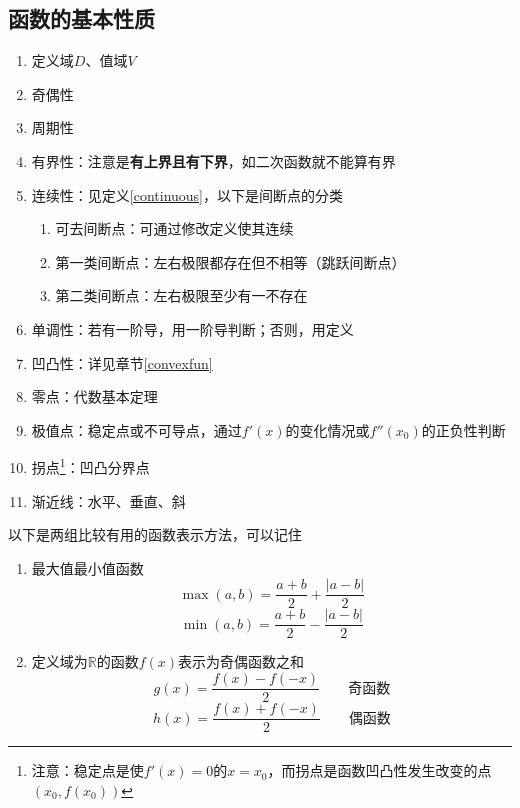 \subsection{函数的基本性质}
\begin{enumerate}
	\itemsep -3pt
	\item 定义域$D$、值域$V$
	\item 奇偶性
	\item 周期性
	\item 有界性：注意是\textbf{有上界且有下界}，如二次函数就不能算有界
	\item 连续性：见定义\ref{continuous}，以下是间断点的分类
	\begin{enumerate}
		\itemsep -3pt
		\item 可去间断点：可通过修改定义使其连续
		\item 第一类间断点：左右极限都存在但不相等（跳跃间断点）
		\item 第二类间断点：左右极限至少有一不存在
	\end{enumerate}
	\item 单调性：若有一阶导，用一阶导判断；否则，用定义
	\item 凹凸性：详见章节\ref{convexfun}
	\item 零点：代数基本定理
	\item 极值点：稳定点或不可导点，通过$f'(x)$的变化情况或$f''(x_0)$的正负性判断
	\item 拐点\footnote{注意：稳定点是使$f'(x)=0$的$x=x_0$，而拐点是函数凹凸性发生改变的点$(x_0,f(x_0))$}：凹凸分界点
	\item 渐近线：水平、垂直、斜
\end{enumerate}
以下是两组比较有用的函数表示方法，可以记住
\begin{enumerate}
	\item 最大值最小值函数
		\[\max(a,b)=\frac{a+b}{2}+\frac{|a-b|}{2}\]
		\[\min(a,b)=\frac{a+b}{2}-\frac{|a-b|}{2}\]
	\item 定义域为$\mathbb{R}$的函数$f(x)$表示为奇偶函数之和
		\[g(x)=\frac{f(x)-f(-x)}{2}\qquad\mbox{奇函数}\]
		\[h(x)=\frac{f(x)+f(-x)}{2}\qquad\mbox{偶函数}\]
\end{enumerate}

